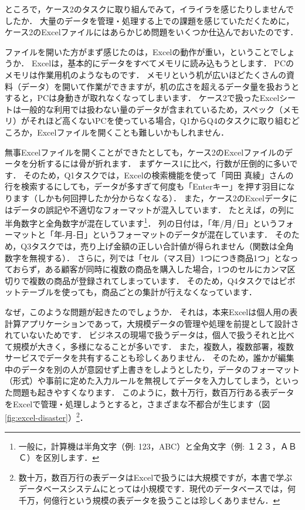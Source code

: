 ところで，ケース2のタスクに取り組んでみて，イライラを感じたりしませんでしたか．
大量のデータを管理・処理する上での課題を感じていただくために，ケース2のExcelファイルにはあらかじめ問題をいくつか仕込んでおいたのです．

ファイルを開いた方がまず感じたのは，Excelの動作が重い，ということでしょうか．
Excelは，基本的にデータをすべてメモリに読み込もうとします．
PCのメモリは作業用机のようなものです．
メモリという机が広いほどたくさんの資料（データ）を開いて作業ができますが，机の広さを超えるデータ量を扱おうとすると，PCは身動きが取れなくなってしまいます．
ケース2で扱ったExcelシートは一般的な利用では扱わない量のデータが含まれているため，スペック（メモリ）がそれほど高くないPCを使っている場合，Q1からQ4のタスクに取り組むどころか，Excelファイルを開くことも難しいかもしれません．

無事Excelファイルを開くことができたとしても，ケース2のExcelファイルのデータを分析するには骨が折れます．
まずケース1に比べ，行数が圧倒的に多いです．
そのため，Q1タスクでは，Excelの検索機能を使って「岡田 真綾」さんの行を検索するにしても，データが多すぎて何度も「Enterキー」を押す羽目になります（しかも何回押したか分からなくなる）．
また，ケース2のExcelデータにはデータの誤記や不適切なフォーマットが混入しています．
たとえば，の列に半角数字と全角数字が混在しています\footnote{一般に，計算機は半角文字（例: 123，ABC）と全角文字（例: １２３，ＡＢＣ）を区別します．}．
列の日付は，「年/月/日」というフォーマットと「年-月-日」というフォーマットのデータが混在しています．
そのため，Q3タスクでは，売り上げ金額の正しい合計値が得られません（関数は全角数字を無視する）．
さらに，列では「セル（マス目）1つにつき商品1つ」となっておらず，ある顧客が同時に複数の商品を購入した場合，1つのセルにカンマ区切りで複数の商品が登録されてしまっています．
そのため，Q4タスクではピボットテーブルを使っても，商品ごとの集計が行えなくなっています．

なぜ，このような問題が起きたのでしょうか．
それは，本来Excelは個人用の表計算アプリケーションであって，大規模データの管理や処理を前提として設計されていないためです．
ビジネスの現場で扱うデータは，個人で扱うそれと比べて規模が大きく，多様になることが多いです．
また，複数人，複数部署，複数サービスでデータを共有することも珍しくありません．
そのため，誰かが編集中のデータを別の人が意図せず上書きをしようとしたり，データのフォーマット（形式）や事前に定めた入力ルールを無視してデータを入力してしまう，といった問題も起きやすくなります．
このように，数十万行，数百万行ある表データをExcelで管理・処理しようとすると，さまざまな不都合が生じます（図\ref{fig:excel-disaster}）\footnote{数十万，数百万行の表データはExcelで扱うには大規模ですが，本書で学ぶデータベースシステムにとっては小規模です．現代のデータベースでは，何千万，何億行という規模の表データを扱うことは珍しくありません．}．

